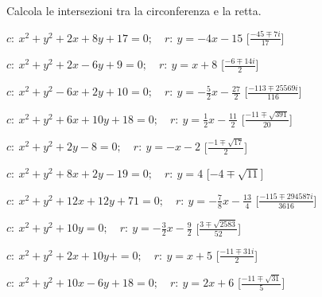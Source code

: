 \begin{esercizio}\label{ese:}
 Calcola le intersezioni tra la circonferenza e la retta.
 \begin{enumeratea}
  \item  \(c:~x^2 + y^2 +2x +8y +17 = 0; \quad r:~y = -4 x -15\)
   \hfill [\(\frac{-45 \mp 7i}{17}\)]
  \item  \(c:~x^2 + y^2 +2x -6y +9 = 0; \quad r:~y = x +8\)
   \hfill [\(\frac{-6 \mp 14i}{2}\)]
  \item  \(c:~x^2 + y^2 -6x +2y +10 = 0; \quad r:~y = -\frac{5}{2} x 
-\frac{27}{2}\)
   \hfill [\(\frac{-113 \mp 25569i}{116}\)]
  \item  \(c:~x^2 + y^2 +6x +10y +18 = 0; \quad r:~y = \frac{1}{2} x 
-\frac{11}{2}\)
   \hfill [\(\frac{-11 \mp \sqrt{391}}{20}\)]
  \item  \(c:~x^2 + y^2 +2y -8 = 0; \quad r:~y = - x -2\)
   \hfill [\(\frac{-1 \mp \sqrt{17}}{2}\)]
  \item  \(c:~x^2 + y^2 +8x +2y -19 = 0; \quad r:~y = 4\)
   \hfill [\(-4 \mp \sqrt{11}\)]
  \item  \(c:~x^2 + y^2 +12x +12y +71 = 0; \quad r:~y = -\frac{7}{8} x 
-\frac{13}{4}\)
   \hfill [\(\frac{-115 \mp 294587i}{3616}\)]
  \item  \(c:~x^2 + y^2 +10y  = 0; \quad r:~y = -\frac{3}{2} x -\frac{9}{2}\)
   \hfill [\(\frac{3 \mp \sqrt{2583}}{52}\)]
  \item  \(c:~x^2 + y^2 +2x +10y + = 0; \quad r:~y = x +5\)
   \hfill [\(\frac{-11 \mp 31i}{2}\)]
  \item  \(c:~x^2 + y^2 +10x -6y +18 = 0; \quad r:~y = 2 x +6\)
   \hfill [\(\frac{-11 \mp \sqrt{31}}{5}\)]
 \end{enumeratea}
\end{esercizio}


